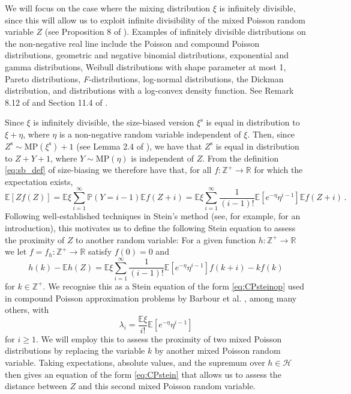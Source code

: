 \documentclass[12pt]{article}
\begin{document}
We will focus on the case where the mixing distribution $\xi$ is infinitely divisible, since this will allow us to exploit infinite divisibility of the mixed Poisson random variable $Z$ (see Proposition 8 of \cite{karlis05}). Examples of infinitely divisible distributions on the non-negative real line include the Poisson and compound Poisson distributions, geometric and negative binomial distributions, exponential and gamma distributions, Weibull distributions with shape parameter at most 1, Pareto distributions, \emph{F}-distributions, log-normal distributions, the Dickman distribution, and distributions with a log-convex density function. See Remark 8.12 of \cite{sato99} and Section 11.4 of \cite{arratia19}.   

Since $\xi$ is infinitely divisible, the size-biased version $\xi^\text{s}$ is equal in distribution to $\xi+\eta$, where $\eta$ is a non-negative random variable independent of $\xi$. Then, since $Z^\text{s}\sim\text{MP}(\xi^\text{s})+1$ (see Lemma 2.4 of \cite{arratia19}), we have that $Z^\text{s}$ is equal in distribution to $Z+Y+1$, where $Y\sim\text{MP}(\eta)$ is independent of $Z$. From the definition \eqref{eq:sb_def} of size-biasing we therefore have that, for all $f:\mathbb{Z}^+\to\mathbb{R}$ for which the expectation exists,
\[
\mathbb{E}[Zf(Z)]=\mathbb{E}\xi\sum_{i=1}^\infty\mathbb{P}(Y=i-1)\mathbb{E}f(Z+i)=\mathbb{E}\xi\sum_{i=1}^\infty\frac{1}{(i-1)!}\mathbb{E}[e^{-\eta}\eta^{i-1}]\mathbb{E}f(Z+i)\,.
\]
Following well-established techniques in Stein's method (see, for example, \cite{ross11} for an introduction), this motivates us to define the following Stein equation to assess the proximity of $Z$ to another random variable: For a given function $h:\mathbb{Z}^+\to\mathbb{R}$ we let $f=f_h:\mathbb{Z}^+\to\mathbb{R}$ satisfy $f(0)=0$ and
\begin{equation}\label{eq:MPSteinop}
h(k)-\mathbb{E}h(Z)=\mathbb{E}\xi\sum_{i=1}^\infty\frac{1}{(i-1)!}\mathbb{E}[e^{-\eta}\eta^{i-1}]f(k+i)-kf(k)
\end{equation}
for $k\in\mathbb{Z}^+$. We recognise this as a Stein equation of the form \eqref{eq:CPsteinop} used in compound Poisson approximation problems by Barbour et al$.$ \cite{barbour92_paper}, among many others, with
\begin{equation}\label{eq:lambda_def}
\lambda_i=\frac{\mathbb{E}\xi}{i!}\mathbb{E}[e^{-\eta}\eta^{i-1}]
\end{equation}
for $i\geq1$. We will employ this to assess the proximity of two mixed Poisson distributions by replacing the variable $k$ by another mixed Poisson random variable. Taking expectations, absolute values, and the supremum over $h\in\mathcal{H}$ then gives an equation of the form \eqref{eq:CPstein} that allows us to assess the distance between $Z$ and this second mixed Poisson random variable.
\end{document}
